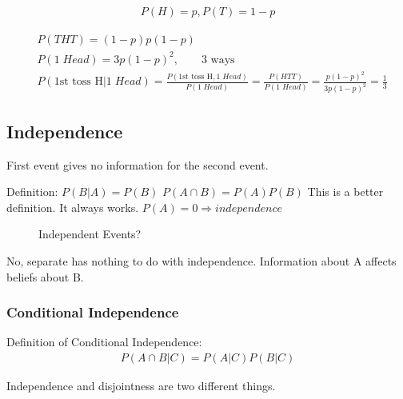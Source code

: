 \documentclass{article}
\begin{document}
\begin{align*}
P(H)=p, P(T)=1-p
\end{align*}

\begin{align*}
&P(THT)=(1-p)p(1-p)\\
&P(1\;Head)=3p(1-p)^2, \qquad \text{3 ways}\\
&P(\text{1st toss H}|1\;Head)=\frac{P(\text{1st toss H},1\;Head)}{P(1\;Head)}=\frac{P(HTT)}{P(1\;Head)}=\frac{p(1-p)^2}{3p(1-p)^2}=\frac{1}{3}
\end{align*}
% 

\subsection{Independence}


First event gives no information for the second event.

Definition: $P(B|A)=P(B)$
$P(A \cap B)=P(A)P(B)$ This is a better definition.  It always works.
$P(A)=0 \Rightarrow independence$

\begin{figure}[ht]
\centering
{}
\caption{Independent Events?} \label{fig:M22}
\end{figure}


No, separate has nothing to do with independence.  Information about A affects beliefs about B.

\subsubsection{Conditional Independence}


Definition of Conditional Independence:
\begin{align*}
P(A \cap B | C) = P(A|C)P(B|C)
\end{align*}

 Independence and disjointness are two different things.
\end{document}
